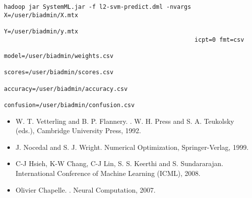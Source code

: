 \begin{verbatim}
hadoop jar SystemML.jar -f l2-svm-predict.dml -nvargs X=/user/biadmin/X.mtx 
                                                      Y=/user/biadmin/y.mtx 
                                                      icpt=0 fmt=csv
                                                      model=/user/biadmin/weights.csv
                                                      scores=/user/biadmin/scores.csv
                                                      accuracy=/user/biadmin/accuracy.csv
                                                      confusion=/user/biadmin/confusion.csv
\end{verbatim}


\begin{itemize}
\item W. T. Vetterling and B. P. Flannery. . \newblock W. H. Press and S. A. Teukolsky
(eds.), Cambridge University Press, 1992.
\item J. Nocedal and  S. J. Wright. Numerical Optimization, Springer-Verlag, 1999.
\item C-J Hsieh, K-W Chang, C-J Lin, S. S. Keerthi and S. Sundararajan.  \newblock International Conference of Machine Learning
(ICML), 2008.
\item Olivier Chapelle. . \newblock Neural 
Computation, 2007.
\end{itemize}

